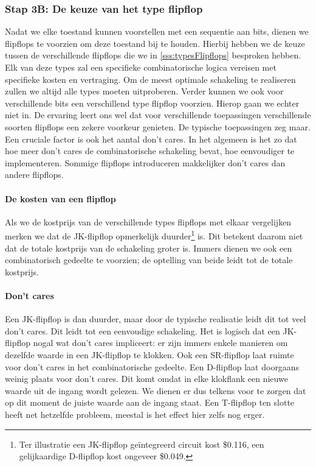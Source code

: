 \subsubsection{Stap 3B: De keuze van het type flipflop}
Nadat we elke toestand kunnen voorstellen met een sequentie aan bits, dienen we flipflops te voorzien om deze toestand bij te houden. Hierbij hebben we de keuze tussen de verschillende flipflops die we in \ref{sss:typesFlipflops} besproken hebben. Elk van deze types zal een specifieke combinatorische logica vereisen met specifieke kosten en vertraging. Om de meest optimale schakeling te realiseren zullen we altijd alle types moeten uitproberen. Verder kunnen we ook voor verschillende bits een verschillend type flipflop voorzien. Hierop gaan we echter niet in. De ervaring leert ons wel dat voor verschillende toepassingen verschillende soorten flipflops een zekere voorkeur genieten. De typische toepassingen zeg maar. Een cruciale factor is ook het aantal don't cares. In het algemeen is het zo dat hoe meer don't cares de combinatorische schakeling bevat, hoe eenvoudiger te implementeren. Sommige flipflops introduceren makkelijker don't cares dan andere flipflops.
\paragraph{De kosten van een flipflop}Als we de kostprijs van de verschillende types flipflops met elkaar vergelijken merken we dat de JK-flipflop opmerkelijk duurder\footnote{Ter illustratie een JK-flipflop ge\"integreerd circuit kost \$0.116, een gelijkaardige D-flipflop kost ongeveer \$0.049.} is. Dit betekent daarom niet dat de totale kostprijs van de schakeling groter is. Immers dienen we ook een combinatorisch gedeelte te voorzien; de optelling van beide leidt tot de totale kostprijs.
\paragraph{Don't cares}Een JK-flipflop is dan duurder, maar door de typische realisatie leidt dit tot veel don't cares. Dit leidt tot een eenvoudige schakeling. Het is logisch dat een JK-flipflop nogal wat don't cares impliceert: er zijn immers enkele manieren om dezelfde waarde in een JK-flipflop te klokken. Ook een SR-flipflop laat ruimte voor don't cares in het combinatorische gedeelte. Een D-flipflop laat doorgaans weinig plaats voor don't cares. Dit komt omdat in elke klokflank een nieuwe waarde uit de ingang wordt gelezen. We dienen er dus telkens voor te zorgen dat op dit moment de juiste waarde aan de ingang staat. Een T-flipflop ten slotte heeft net hetzelfde probleem, meestal is het effect hier zelfs nog erger.
